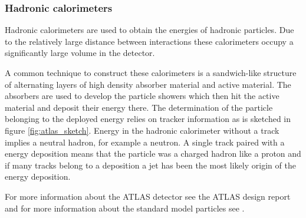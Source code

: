 \subsubsection{Hadronic calorimeters}

Hadronic calorimeters are used to obtain the energies of hadronic particles.
Due to the relatively large distance between interactions these calorimeters occupy a significantly large volume in the detector.\cite{leo}

A common technique to construct these calorimeters is a sandwich-like structure of alternating layers of high density absorber material and active material. 
The absorbers are used to develop the particle showers which then hit the active material and deposit their energy there. The determination of the particle belonging to the deployed energy relies on tracker information as is sketched in figure \ref{fig:atlas_sketch}. Energy in the hadronic calorimeter without a track implies a neutral hadron, for example a neutron. A single track paired with a energy deposition means that the particle was a charged hadron like a proton and if many tracks belong to a deposition a jet has been the most likely origin of the energy deposition.
\newline
\newline

For more information about the ATLAS detector see the ATLAS design report \cite{atlas_report} and for more information about the standard model particles see \cite{griffith}.